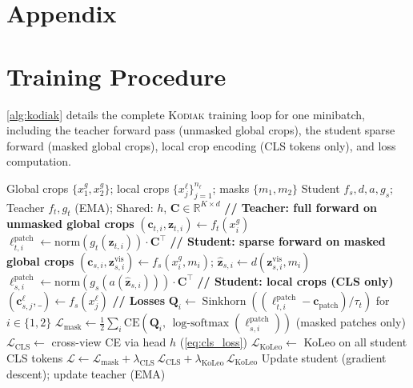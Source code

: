 \documentclass[runningheads]{llncs}
\newcommand{\method}{\textsc{Kodiak}}
\DeclareMathOperator{\logsoftmax}{log\text{-}softmax}
\DeclareMathOperator{\sinkhorn}{Sinkhorn}
\begin{document}
\appendix
\section*{Appendix}

\section{Training Procedure}
\label{sec:app_algorithm}

\cref{alg:kodiak} details the complete \method{} training loop for one minibatch, including the teacher forward pass (unmasked global crops), the student sparse forward (masked global crops), local crop encoding (CLS tokens only), and loss computation.

\begin{algorithm}[ht]
\caption{\method{} Pretraining}
\label{alg:kodiak}
\small
\begin{algorithmic}[1]
\Require Global crops $\{x^g_1, x^g_2\}$; local crops $\{x^\ell_j\}_{j=1}^{n_\ell}$; masks $\{m_1, m_2\}$
\Require Student $f_s, d, a, g_s$; Teacher $f_t, g_t$ (EMA); Shared: $h$, $\mathbf{C} \in \mathbb{R}^{K \times d}$
    \State \textcolor{kodiakblue}{\textbf{// Teacher: full forward on unmasked global crops}}
        \State $(\mathbf{c}_{t,i}, \mathbf{z}_{t,i}) \gets f_t(x^g_i)$
        \State $\boldsymbol{\ell}^{\text{patch}}_{t,i} \gets \mathrm{norm}(g_t(\mathbf{z}_{t,i})) \cdot \mathbf{C}^\top$
    \EndFor
    \State \textcolor{kodiakblue}{\textbf{// Student: sparse forward on masked global crops}}
        \State $(\mathbf{c}_{s,i}, \mathbf{z}^{\text{vis}}_{s,i}) \gets f_s(x^g_i, m_i)$; \quad $\hat{\mathbf{z}}_{s,i} \gets d(\mathbf{z}^{\text{vis}}_{s,i}, m_i)$
        \State $\boldsymbol{\ell}^{\text{patch}}_{s,i} \gets \mathrm{norm}(g_s(a(\hat{\mathbf{z}}_{s,i}))) \cdot \mathbf{C}^\top$
    \EndFor
    \State \textcolor{kodiakblue}{\textbf{// Student: local crops (CLS only)}}
        \State $(\mathbf{c}^\ell_{s,j}, \_) \gets f_s(x^\ell_j)$
    \EndFor
    \State \textcolor{kodiakgreen}{\textbf{// Losses}}
    \State $\mathbf{Q}_i \gets \sinkhorn((\boldsymbol{\ell}^{\text{patch}}_{t,i} - \mathbf{c}_{\text{patch}})/\tau_t)$ \quad for $i \in \{1,2\}$
    \State $\mathcal{L}_{\text{mask}} \gets \tfrac{1}{2}\sum_{i} \mathrm{CE}(\mathbf{Q}_i,\, \logsoftmax(\boldsymbol{\ell}^{\text{patch}}_{s,i}))$ \quad (masked patches only)
    \State $\mathcal{L}_{\text{CLS}} \gets$ cross-view CE via head $h$ (\cref{eq:cls_loss})
    \State $\mathcal{L}_{\text{KoLeo}} \gets$ KoLeo on all student CLS tokens
    \State $\mathcal{L} \gets \mathcal{L}_{\text{mask}} + \lambda_{\text{CLS}}\,\mathcal{L}_{\text{CLS}} + \lambda_{\text{KoLeo}}\,\mathcal{L}_{\text{KoLeo}}$
    \State Update student (gradient descent); update teacher (EMA)
\EndFor
\end{algorithmic}
\end{algorithm}
\end{document}
